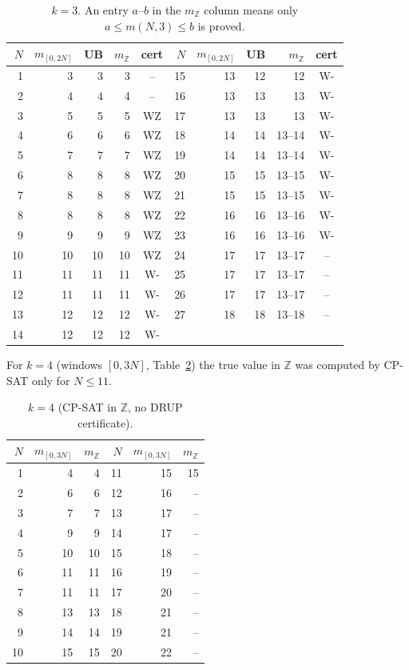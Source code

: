 \documentclass[11pt]{article}
\begin{document}
\begin{table}[h]
\centering\small\setlength{\tabcolsep}{4pt}
\begin{tabular}{@{}rrrrc|rrrrc@{}}
\toprule
$N$ & $m_{[0,2N]}$ & UB & $m_{\mathbb Z}$ & cert & $N$ & $m_{[0,2N]}$ & UB & $m_{\mathbb Z}$ & cert\\
\midrule
1 & 3 & 3 & 3 & -- & 15 & 13 & 12 & 12 & W- \\
2 & 4 & 4 & 4 & -- & 16 & 13 & 13 & 13 & W- \\
3 & 5 & 5 & 5 & WZ & 17 & 13 & 13 & 13 & W- \\
4 & 6 & 6 & 6 & WZ & 18 & 14 & 14 & 13--14 & W- \\
5 & 7 & 7 & 7 & WZ & 19 & 14 & 14 & 13--14 & W- \\
6 & 8 & 8 & 8 & WZ & 20 & 15 & 15 & 13--15 & W- \\
7 & 8 & 8 & 8 & WZ & 21 & 15 & 15 & 13--15 & W- \\
8 & 8 & 8 & 8 & WZ & 22 & 16 & 16 & 13--16 & W- \\
9 & 9 & 9 & 9 & WZ & 23 & 16 & 16 & 13--16 & W- \\
10 & 10 & 10 & 10 & WZ & 24 & 17 & 17 & 13--17 & -- \\
11 & 11 & 11 & 11 & W- & 25 & 17 & 17 & 13--17 & -- \\
12 & 11 & 11 & 11 & W- & 26 & 17 & 17 & 13--17 & -- \\
13 & 12 & 12 & 12 & W- & 27 & 18 & 18 & 13--18 & -- \\
14 & 12 & 12 & 12 & W- &  & & & &  \\
\bottomrule
\end{tabular}
\caption{$k=3$. An entry $a$--$b$ in the $m_{\mathbb Z}$ column means only $a\le m(N,3)\le b$ is proved.}\label{tab:k3}
\end{table}

For $k=4$ (windows $[0,3N]$, Table~\ref{tab:k4}) the true value in $\mathbb Z$ was computed by CP-SAT only for $N\le 11$.
\begin{table}[h]
\centering\small
\begin{tabular}{@{}rrr|rrr@{}}
\toprule
$N$ & $m_{[0,3N]}$ & $m_{\mathbb Z}$ & $N$ & $m_{[0,3N]}$ & $m_{\mathbb Z}$\\
\midrule
1 & 4 & 4 & 11 & 15 & 15 \\
2 & 6 & 6 & 12 & 16 & -- \\
3 & 7 & 7 & 13 & 17 & -- \\
4 & 9 & 9 & 14 & 17 & -- \\
5 & 10 & 10 & 15 & 18 & -- \\
6 & 11 & 11 & 16 & 19 & -- \\
7 & 11 & 11 & 17 & 20 & -- \\
8 & 13 & 13 & 18 & 21 & -- \\
9 & 14 & 14 & 19 & 21 & -- \\
10 & 15 & 15 & 20 & 22 & -- \\
\bottomrule
\end{tabular}
\caption{$k=4$ (CP-SAT in $\mathbb Z$, no DRUP certificate).}\label{tab:k4}
\end{table}
\end{document}
